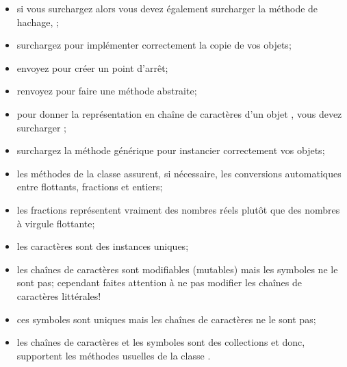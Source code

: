 \documentclass[a4paper,10pt,twoside]{book}
\begin{document}
\begin{itemize}

  \item si vous surchargez \ct{=} alors vous devez également
    surcharger la méthode de hachage, ;

  \item surchargez  pour implémenter correctement la copie de vos objets;

  \item envoyez  pour créer un point d'arrêt;

  \item renvoyez  pour faire une méthode abstraite;

  \item pour donner la représentation en chaîne de caractères d'un objet , vous devez surcharger ;

  \item surchargez la méthode générique  pour instancier correctement vos objets;


  \item les méthodes de la classe  assurent, si
    nécessaire, les conversions automatiques entre flottants, fractions et entiers;

  \item les fractions représentent vraiment des nombres réels plutôt que des nombres à virgule flottante;

  \item les caractères sont des instances uniques;

  \item les chaînes de caractères sont modifiables (mutables) mais les symboles ne le sont pas;
  cependant faites attention à ne pas modifier les chaînes de caractères littérales!

  \item ces symboles sont uniques mais les chaînes de caractères ne le sont pas;

  \item les chaînes de caractères et les symboles sont des collections et donc, supportent les méthodes usuelles de la classe .

\end{itemize}

\ifx\wholebook\relax\else
   
   
\end{document}
